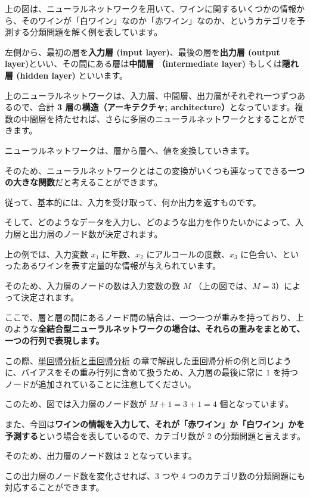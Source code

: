 上の図は、ニューラルネットワークを用いて、ワインに関するいくつかの情報から、そのワインが「白ワイン」なのか「赤ワイン」なのか、というカテゴリを予測する分類問題を解く例を表しています。


左側から、最初の層を\textbf{入力層 (input layer)}、最後の層を\textbf{出力層 (output layer)}といい、その間にある層は\textbf{中間層 （intermediate layer)} もしくは\textbf{隠れ層 (hidden layer)} といいます。

上のニューラルネットワークは、入力層、中間層、出力層がそれぞれ一つずつあるので、合計 \textbf{3 層}の\textbf{構造（アーキテクチャ; architecture）}となっています。複数の中間層を持たせれば、さらに多層のニューラルネットワークとすることができます。


ニューラルネットワークは、層から層へ、値を変換していきます。

そのため、ニューラルネットワークとはこの変換がいくつも連なってできる\textbf{一つの大きな関数}だと考えることができます。

従って、基本的には、入力を受け取って、何か出力を返すものです。

そして、どのようなデータを入力し、どのような出力を作りたいかによって、入力層と出力層のノード数が決定されます。


上の例では、入力変数 $x_1$ に年数、$x_2$ にアルコールの度数、$x_3$ に色合い、といったあるワインを表す定量的な情報が与えられています。

そのため、入力層のノードの数は入力変数の数 $M$ （上の図では、$M = 3$）によって決定されます。

ここで、層と層の間にあるノード間の結合は、一つ一つが重みを持っており、上のような\textbf{全結合型ニューラルネットワークの場合は、それらの重みをまとめて、一つの行列で表現します。}

この際、\href{markdown/ch21-regression-analysis.md}{単回帰分析と重回帰分析} の章で解説した重回帰分析の例と同じように、バイアスをその重み行列に含めて扱うため、入力層の最後に常に $1$ を持つノードが追加されていることに注意してください。

このため、図では入力層のノード数が $M + 1 = 3 + 1 = 4$ 個となっています。


また、今回は\textbf{ワインの情報を入力して、それが「赤ワイン」か「白ワイン」かを予測する}という場合を表しているので、カテゴリ数が 2 の分類問題と言えます。

そのため、出力層のノード数は 2 となっています。

この出力層のノード数を変化させれば、3 つや 4 つのカテゴリ数の分類問題にも対応することができます。

